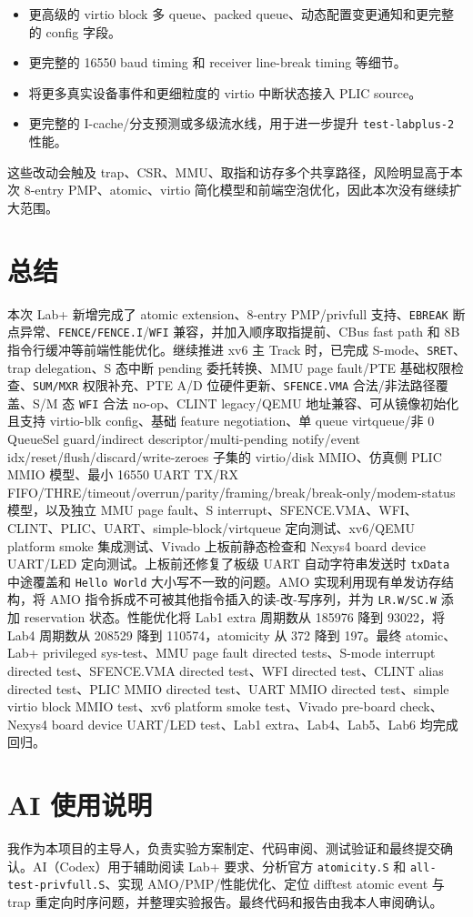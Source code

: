 \documentclass[UTF8,a4paper,11pt]{ctexart}
\begin{document}
\begin{itemize}
  \item 更高级的 virtio block 多 queue、packed queue、动态配置变更通知和更完整的 config 字段。
  \item 更完整的 16550 baud timing 和 receiver line-break timing 等细节。
  \item 将更多真实设备事件和更细粒度的 virtio 中断状态接入 PLIC source。
  \item 更完整的 I-cache/分支预测或多级流水线，用于进一步提升 \texttt{test-labplus-2} 性能。
\end{itemize}

这些改动会触及 trap、CSR、MMU、取指和访存多个共享路径，风险明显高于本次 8-entry PMP、atomic、virtio 简化模型和前端空泡优化，因此本次没有继续扩大范围。

\section{总结}

本次 Lab+ 新增完成了 atomic extension、8-entry PMP/privfull 支持、\texttt{EBREAK} 断点异常、\texttt{FENCE/FENCE.I}/\texttt{WFI} 兼容，并加入顺序取指提前、CBus fast path 和 8B 指令行缓冲等前端性能优化。继续推进 xv6 主 Track 时，已完成 S-mode、\texttt{SRET}、trap delegation、S 态中断 pending 委托转换、MMU page fault/PTE 基础权限检查、\texttt{SUM/MXR} 权限补充、PTE A/D 位硬件更新、\texttt{SFENCE.VMA} 合法/非法路径覆盖、S/M 态 \texttt{WFI} 合法 no-op、CLINT legacy/QEMU 地址兼容、可从镜像初始化且支持 virtio-blk config、基础 feature negotiation、单 queue virtqueue/非 0 QueueSel guard/indirect descriptor/multi-pending notify/event idx/reset/flush/discard/write-zeroes 子集的 virtio/disk MMIO、仿真侧 PLIC MMIO 模型、最小 16550 UART TX/RX FIFO/THRE/timeout/overrun/parity/framing/break/break-only/modem-status 模型，以及独立 MMU page fault、S interrupt、SFENCE.VMA、WFI、CLINT、PLIC、UART、simple-block/virtqueue 定向测试、xv6/QEMU platform smoke 集成测试、Vivado 上板前静态检查和 Nexys4 board device UART/LED 定向测试。上板前还修复了板级 UART 自动字符串发送时 \texttt{txData} 中途覆盖和 \texttt{Hello World} 大小写不一致的问题。AMO 实现利用现有单发访存结构，将 AMO 指令拆成不可被其他指令插入的读-改-写序列，并为 \texttt{LR.W/SC.W} 添加 reservation 状态。性能优化将 Lab1 extra 周期数从 185976 降到 93022，将 Lab4 周期数从 208529 降到 110574，atomicity 从 372 降到 197。最终 atomic、Lab+ privileged sys-test、MMU page fault directed tests、S-mode interrupt directed test、SFENCE.VMA directed test、WFI directed test、CLINT alias directed test、PLIC MMIO directed test、UART MMIO directed test、simple virtio block MMIO test、xv6 platform smoke test、Vivado pre-board check、Nexys4 board device UART/LED test、Lab1 extra、Lab4、Lab5、Lab6 均完成回归。

\section{AI 使用说明}

我作为本项目的主导人，负责实验方案制定、代码审阅、测试验证和最终提交确认。AI（Codex）用于辅助阅读 Lab+ 要求、分析官方 \texttt{atomicity.S} 和 \texttt{all-test-privfull.S}、实现 AMO/PMP/性能优化、定位 difftest atomic event 与 trap 重定向时序问题，并整理实验报告。最终代码和报告由我本人审阅确认。
\end{document}
